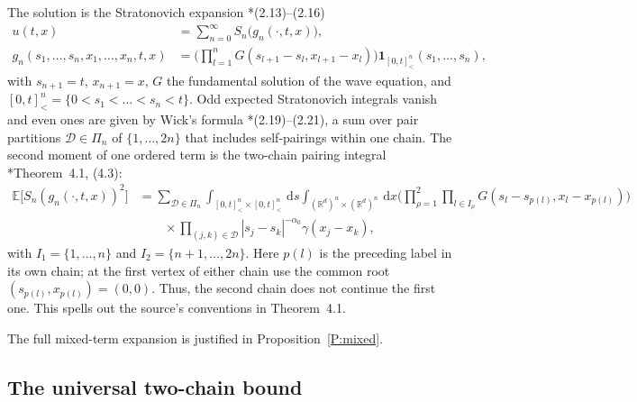 \documentclass[12pt]{article}
\numberwithin{equation}{section}
\theoremstyle{definition}
\newcommand{\R}{\mathbb{R}}
\newcommand{\E}{\mathbb{E}}
\newcommand{\ud}{\,\mathrm{d}}
\begin{document}
The solution is the Stratonovich expansion
\cite{chen:author2026:time-dependency}*{(2.13)--(2.16)}
\begin{equation}\label{E:expansion}
  \begin{split}
    u(t,x)&=\sum_{n=0}^\infty S_n\big(g_n(\cdot,t,x)\big),\\
    g_n(s_1,\dots,s_n,x_1,\dots,x_n,t,x)
    &=\Big(\prod_{l=1}^nG(s_{l+1}-s_l,x_{l+1}-x_l)\Big)
    \mathbf 1_{[0,t]^n_<}(s_1,\dots,s_n),
  \end{split}
\end{equation}
with $s_{n+1}=t$, $x_{n+1}=x$, $G$ the fundamental solution of the wave
equation, and $[0,t]^n_<=\{0<s_1<\dots<s_n<t\}$. Odd expected Stratonovich
integrals vanish and even ones are given by Wick's formula
\cite{chen:author2026:time-dependency}*{(2.19)--(2.21)}, a sum over pair
partitions $\mathcal D\in\Pi_n$ of $\{1,\dots,2n\}$ that includes
self-pairings within one chain. The second moment of one ordered term is
the two-chain pairing integral \cite{chen:author2026:time-dependency}*{Theorem~4.1, (4.3)}:
\begin{equation}\label{E:Sn2}
  \begin{split}
    \E\big[S_n(g_n(\cdot,t,x))^2\big]
    &=\sum_{\mathcal D\in\Pi_n}\int_{[0,t]^n_<\times[0,t]^n_<}\ud s
    \int_{(\R^d)^n\times(\R^d)^n}\ud x
    \Big(\prod_{\rho=1}^2\prod_{l\in I_\rho}
    G(s_l-s_{p(l)},x_l-x_{p(l)})\Big)\\
    &\qquad\times\prod_{(j,k)\in\mathcal D}|s_j-s_k|^{-\alpha_0}\gamma(x_j-x_k),
  \end{split}
\end{equation}
with $I_1=\{1,\dots,n\}$ and $I_2=\{n+1,\dots,2n\}$.
Here $p(l)$ is the preceding label in its own chain; at the first vertex
of either chain use the common root $(s_{p(l)},x_{p(l)})=(0,0)$.
Thus, the second chain does not continue the first one. This spells out
the source's conventions in Theorem~4.1.

The full mixed-term expansion is justified in Proposition~\ref{P:mixed}.

\subsection{The universal two-chain bound}
\end{document}
